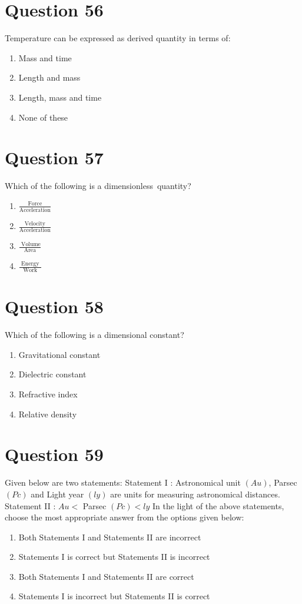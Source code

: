 \documentclass{article}
\begin{document}
\section*{Question 56}
Temperature can be expressed as derived quantity in terms of:
\begin{enumerate}[label=(\alph*)]
\item Mass and time
\item Length and mass
\item Length, mass and time
\item None of these
\end{enumerate}
\newpage
\section*{Question 57}
Which of the following is a dimensionless quantity?
\begin{enumerate}[label=(\alph*)]
\item \(\frac{\text {Force}}{\text {Acceleration}}\)
\item \(\frac{\text {Velocity}}{\text {Acceleration}}\)\newline
\item \(\frac{\text { Volume}}{\text {Area}}\)
\item \(\frac{\text { Energy }}{\text { Work }}\)
\end{enumerate}
\newpage
\section*{Question 58}
Which of the following is a dimensional constant?
\begin{enumerate}[label=(\alph*)]
\item Gravitational constant
\item Dielectric constant
\item Refractive index
\item Relative density
\end{enumerate}
\newpage
\section*{Question 59}
Given below are two statements:
Statement I : Astronomical unit \((Au)\), Parsec \((Pc)\) and Light year \((ly)\) are units for measuring astronomical distances.
Statement II : \(Au <\) Parsec \(( Pc )< ly\)
In the light of the above statements, choose the most appropriate answer from the options given below: 
\begin{enumerate}[label=(\alph*)]
\item Both Statements I and Statements II are incorrect
\item Statements I is correct but Statements II is incorrect
\item Both Statements I and Statements II are correct
\item Statements I is incorrect but Statements II is correct
\end{enumerate}
\newpage
\end{document}
